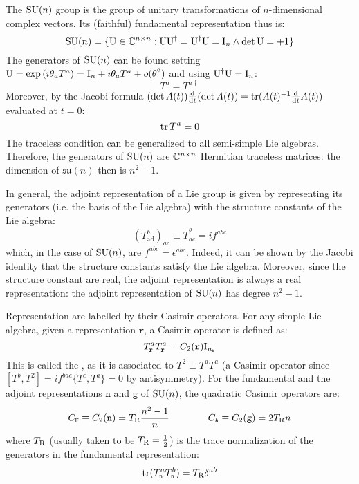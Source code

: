 The $ \mathrm{SU}(n) $ group is the group of unitary transformations of $ n $-dimensional complex vectors. Its (faithful) fundamental representation thus is:
\begin{equation*}
  \mathrm{SU}(n) = \{\mathrm{U} \in \mathbb{C}^{n \times n} : \mathrm{U}\mathrm{U}^\dagger = \mathrm{U}^\dagger\mathrm{U} = \mathrm{I}_n \land \det{\mathrm{U}} = +1 \}
\end{equation*}
The generators of $ \mathrm{SU}(n) $ can be found setting $ \mathrm{U} = \exp \left( i \theta_a T^a \right) = \mathrm{I}_n + i \theta_a T^a + o(\theta^2) $ and using $ \mathrm{U}^\dagger\mathrm{U} = \mathrm{I}_n $:
\begin{equation}
  T^a = T^{a\dagger}
  \label{eq:sun-herm}
\end{equation}
Moreover, by the Jacobi formula $ (\det A(t)) \frac{\mathrm{d}}{\mathrm{d} t} (\det A(t)) = \operatorname{tr} (A(t)^{-1} \frac{\mathrm{d}}{\mathrm{d} t} A(t)) $ evaluated at $ t = 0 $:
\begin{equation}
  \operatorname{tr} T^a = 0
  \label{eq:sun-trace}
\end{equation}
The traceless condition can be generalized to all semi-simple Lie algebras.
Therefore, the generators of $ \mathrm{SU}(n) $ are $ \mathbb{C}^{n \times n} $ Hermitian traceless matrices: the dimension of $ \mathfrak{su}(n) $ then is $ n^2 - 1 $.

In general, the adjoint representation of a Lie group is given by representing its generators (i.e. the basis of the Lie algebra) with the structure constants of the Lie algebra:
\begin{equation}
  (T^b_\text{ad})_{ac} \equiv \bar{T}^b_{ac} = i f^{abc}
\end{equation}
which, in the case of $ \mathrm{SU}(n) $, are $ f^{abc} = \epsilon^{abc} $. Indeed, it can be shown by the Jacobi identity that the structure constants satisfy the Lie algebra. Moreover, since the structure constant are real, the adjoint representation is always a real representation: the adjoint representation of $ \mathrm{SU}(n) $ has degree $ n^2 - 1 $.

Representation are labelled by their Casimir operators. For any simple Lie algebra, given a representation $ \mathtt{r} $, a Casimir operator is defined as:
\begin{equation}
  T^a_\mathtt{r} T^a_\mathtt{r} = C_2(\mathtt{r}) \mathrm{I}_{n_{\mathtt{r}}}
  \label{eq:quad-cas}
\end{equation}
This is called the , as it is associated to $ T^2 \equiv T^a T^a $ (a Casimir operator since $ [T^b, T^2] = i f^{bac} \{T^c,T^a\} = 0 $ by antisymmetry). For the fundamental and the adjoint representations $ \mathtt{n} $ and $ \mathtt{g} $ of $ \mathrm{SU}(n) $, the quadratic Casimir operators are:
\begin{equation}
  C_\mathtt{F} \equiv C_2(\mathtt{n}) = T_\text{R} \frac{n^2 - 1}{n}
  \qquad \qquad
  C_\mathtt{A} \equiv C_2(\mathtt{g}) = 2T_\text{R} n
\end{equation}
where $ T_\text{R} $ (usually taken to be $ T_\text{R} = \frac{1}{2} $) is the trace normalization of the generators in the fundamental representation:
\begin{equation}
  \operatorname{tr} (T^a_\mathtt{n} T^b_\mathtt{n}) = T_\text{R} \delta^{ab}
  \label{eq:diag-norm}
\end{equation}

